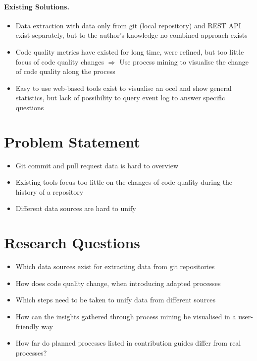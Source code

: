 \paragraph{Existing Solutions.}
\begin{itemize}
	\item Data extraction with data only from git (local repository) and REST API exist separately, but to the author's knowledge no combined approach exists
	\item Code quality metrics have existed for long time, were refined, but too little focus of code quality changes $\Rightarrow$ Use process mining to visualise the change of code quality along the process
	\item Easy to use web-based tools exist to visualise an \ac{ocel} and show general statistics, but lack of possibility to query event log to answer specific questions
\end{itemize}


\section{Problem Statement}
\label{sec:intro_ssec:probs}
\begin{itemize}
	\item Git commit and pull request data is hard to overview
	\item Existing tools focus too little on the changes of code quality during the history of a repository
	\item Different data sources are hard to unify
\end{itemize}


\section{Research Questions}
\label{sec:intro_ssec:rqs}
\begin{itemize}
	\item Which data sources exist for extracting data from git repositories
	\item How does code quality change, when introducing adapted processes
	\item Which steps need to be taken to unify data from different sources
	\item How can the insights gathered through process mining be visualised in a user-friendly way
	\item How far do planned processes listed in contribution guides differ from real processes?
\end{itemize}

